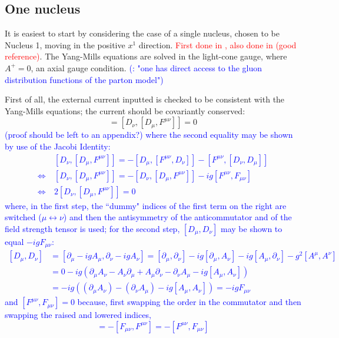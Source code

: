 \subsection{One nucleus}
It is easiest to start by considering the case of a single nucleus, chosen to be Nucleus 1, moving in the positive $x^1$ direction. \textcolor{red}{First done in \cite{}, also done in \cite{} (good reference)}. The Yang-Mills equations are solved in the light-cone gauge, where $A^+=0$, an axial gauge condition. \textcolor{blue}{(\cite{Kovner_1995}: "one has direct access to the gluon distribution functions of the parton model")}

First of all, the external current inputted is checked to be consistent with the Yang-Mills equations; the current should be covariantly conserved:
\begin{equation}
	[D_\nu, J^\nu] = [D_\nu, [D_\mu, F^{\mu \nu}]] = 0
	\label{eq:covariant_conservation}
\end{equation}
\textcolor{blue}{ (proof should be left to an appendix?) where the second equality may be shown by use of the Jacobi Identity:
\begin{equation}
	\begin{split}
		& [D_\nu, [D_\mu, F^{\mu \nu}]] = - [D_\mu, [F^{\mu \nu}, D_\nu]] - [F^{\mu \nu}, [D_\nu, D_\mu]] \\
		\Leftrightarrow ~ & [D_\nu, [D_\mu, F^{\mu \nu}]] = - [D_\nu, [D_\mu, F^{\mu \nu}]] - ig [F^{\mu \nu}, F_{\mu \nu}]
		\\
		\Leftrightarrow ~ & 2 [D_\nu, [D_\mu, F^{\mu \nu}]] = 0
	\end{split}
\end{equation}
where, in the first step, the ``dummy" indices of the first term on the right are switched ($\mu 	\leftrightarrow \nu$) and then the antisymmetry of the anticommutator and of the field strength tensor is used; for the second step, $[D_\mu, D_\nu]$ may be shown to equal $-ig F_{\mu \nu}$:
\begin{equation}
	\begin{split}
		[D_\mu, D_\nu] & = [\partial_\mu - i g A_\mu, \partial_\nu - i g A_\nu] = [\partial_\mu, \partial_\nu] - ig [\partial_\mu, A_\nu] - i g [A_\mu, \partial_\nu] - g^2 [A^\mu, A^\nu] \\
		& =  0 - ig \left( \partial_\mu A_\nu -  A_\nu \partial_\mu + A_\mu \partial_\nu  - \partial_\nu A_\mu - ig [A_\mu, A_\nu] \right) \\
		& = -ig \left( (\partial_\mu A_\nu) - (\partial_\nu A_\mu) - ig [A_\mu, A_\nu] \right) = -ig F_{\mu\nu}
	\end{split}
\end{equation}
and $[F^{\mu\nu}, F_{\mu\nu}] = 0$ because, first swapping the order in the commutator and then swapping the raised and lowered indices,
\begin{equation}
	[F^{\mu\nu}, F_{\mu\nu}] = -[F_{\mu\nu}, F^{\mu\nu}] = - [F^{\mu\nu}, F_{\mu\nu}]
\end{equation}}

